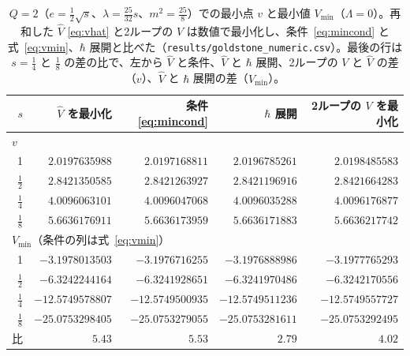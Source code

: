 \documentclass[a4paper,10pt]{ltjsarticle}
\begin{document}
\begin{table}[tbp]
\centering\small
\caption{$Q=2$（$e=\frac12\sqrt s$、$\lambda=\frac{25}{32}s$、$m^2=\frac{25}8$）での最小点 $v$ と最小値 $V_{\min}$（$\Lambda=0$）。再和した $\hat V$ \eqref{eq:vhat} と2ループの $V$ は数値で最小化し、条件~\eqref{eq:mincond} と式~\eqref{eq:vmin}、$\hbar$ 展開と比べた（\texttt{results/goldstone\_numeric.csv}）。最後の行は $s=\frac14$ と $\frac18$ の差の比で、左から $\hat V$ と条件、$\hat V$ と $\hbar$ 展開、2ループの $V$ と $\hat V$ の差（$v$）、$\hat V$ と $\hbar$ 展開の差（$V_{\min}$）。}
\label{tab:goldstone}
\begin{tabular}{rrrrr}
\toprule
$s$ & $\hat V$ を最小化 & 条件 \eqref{eq:mincond} & $\hbar$ 展開 & 2ループの $V$ を最小化 \\
\midrule
\multicolumn{5}{l}{$v$} \\
1 & $2.0197635988$ & $2.0197168811$ & $2.0196785261$ & $2.0198485583$ \\
$\frac12$ & $2.8421350585$ & $2.8421263927$ & $2.8421196916$ & $2.8421664283$ \\
$\frac14$ & $4.0096063101$ & $4.0096047068$ & $4.0096035288$ & $4.0096176877$ \\
$\frac18$ & $5.6636176911$ & $5.6636173959$ & $5.6636171883$ & $5.6636217742$ \\
\midrule
\multicolumn{5}{l}{$V_{\min}$（条件の列は式~\eqref{eq:vmin}）} \\
1 & $-3.1978013503$ & $-3.1976716255$ & $-3.1976888986$ & $-3.1977765293$ \\
$\frac12$ & $-6.3242244164$ & $-6.3241928651$ & $-6.3241970486$ & $-6.3242170556$ \\
$\frac14$ & $-12.5749578807$ & $-12.5749500935$ & $-12.5749511236$ & $-12.5749557727$ \\
$\frac18$ & $-25.0753298405$ & $-25.0753279055$ & $-25.0753281611$ & $-25.0753292495$ \\
\midrule
比 & $5.43$ & $5.53$ & $2.79$ & $4.02$ \\
\bottomrule
\end{tabular}
\end{table}
\end{document}
